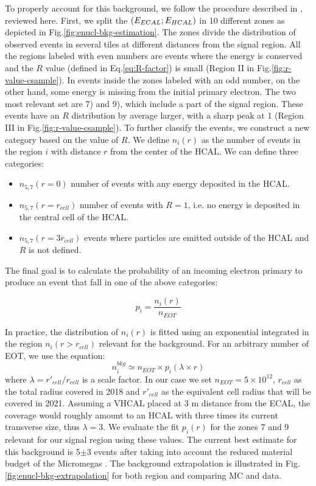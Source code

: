 To properly account for this background, we follow the procedure described in \cite{na64-neutrals-study,pdegen-thesis}, reviewed here.
First, we split the $(E_{ECAL};E_{HCAL})$ in 10 different zones as depicted in Fig.\ref{fig:enucl-bkg-estimation}. The zones divide the distribution of observed events in several tiles at different distances from the signal region. All the regions labeled with even numbers are events where the energy is conserved and the $R$ value (defined in Eq.\ref{eq:R-factor}) is small (Region II in Fig.\ref{fig:r-value-csample}). In events inside the zones labeled with an odd number, on the other hand, some energy is missing from the initial primary electron. The two most relevant set are 7) and 9), which include a part of the signal region. These events have an $R$ distribution by average larger, with a sharp peak at 1 (Region III in Fig.\ref{fig:r-value-csample}). To further classify the events, we construct a new category based on the value of $R$. We define $n_i(r)$ as the number of events in the region $i$ with distance $r$ from the center of the HCAL. We can define three categories:

\begin{itemize}
\item $n_{5,7}(r=0)$ number of events with any energy deposited in the HCAL.
\item $n_{5,7}(r=r_{cell})$ number of events with $R=1$, i.e. no energy is deposited in the central cell of the HCAL.
\item $n_{5,7}(r=3r_{cell})$ events where particles are emitted outside of the HCAL and $R$ is not defined.
\end{itemize}

The final goal is to calculate the probability of an incoming electron primary to produce an event that fall in one of the above categories:

\begin{equation}
  \label{eq:enucl-prob}
  p_i = \frac{n_i(r)}{n_{EOT}}
\end{equation}

In practice, the distribution of $n_{i}(r)$ is fitted using an exponential integrated in the region $n_i(r>r_{cell})$ relevant for the background. For an arbitrary number of EOT, we use the equation:
\begin{equation}
  \label{eq:exp-bkg-inv-2021}
  n^{bkg}_i \simeq n_{EOT} \times p_i(\lambda \times r)
\end{equation}
where $\lambda = r'_{cell}/r_{cell}$ is a scale factor. In our case we set $n_{EOT} = 5 \times 10^{12}$, $r_{cell}$ as the total radius covered in 2018 and $r'_{cell}$ as the equivalent cell radius that will be covered in 2021. Assuming a VHCAL placed at 3 \si{\meter} distance from the ECAL, the coverage would roughly amount to an HCAL with three times its current transverse size, thus $\lambda = 3$. We evaluate the fit $p_i(r)$ for the zones 7 and 9 relevant for our signal region using these values. The current best estimate for this background is 5$\pm$3 events after taking into account the reduced material budget of the Micromegas \cite{pdegen-thesis}. The background extrapolation is illustrated in Fig.\ref{fig:enucl-bkg-extrapolation} for both region and comparing MC and data.


